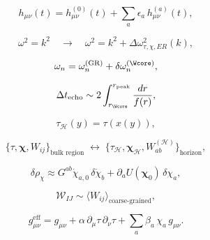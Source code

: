 \[
h_{\mu\nu}(t)
=
h^{(0)}_{\mu\nu}(t)
+
\sum_a \epsilon_a\, h^{(a)}_{\mu\nu}(t),
\]

\[
\omega^2 = k^2 \quad \longrightarrow \quad
\omega^2 = k^2 + \Delta\omega^2_{\tau,\chi,ER}(k),
\]

\[
\omega_n = \omega_n^{\mathrm{(GR)}} + \delta\omega_n^{(\Wcore)},
\]

\[
\Delta t_{\mathrm{echo}} \sim 2\int_{r_{\Wcore}}^{r_{\mathrm{peak}}} \frac{dr}{f(r)},
\]

\[
\tau_{\mathcal{H}}(y) = \tau(x(y)),
\]

\[
\{\tau,\bm{\chi},W_{ij}\}_{\text{bulk region}} \;\longleftrightarrow\;
  \{\tau_{\mathcal{H}},\bm{\chi}_{\mathcal{H}},W_{ab}^{(\mathcal{H})}\}_{\text{horizon}},
\]

\[
\delta \rho_\chi \approx G^{ab}\dot{\chi}_{a,0}\,\delta\dot{\chi}_b + \partial_a U(\bm{\chi}_0)\,\delta\chi_a,
\]

\[
\mathcal{W}_{IJ} \sim \langle W_{ij} \rangle_{\text{coarse-grained}},
\]

\[
g_{\mu\nu}^{\mathrm{eff}} = g_{\mu\nu} + \alpha\,\partial_\mu\tau\,\partial_\nu\tau 
+ \sum_a \beta_a\,\chi_a\,g_{\mu\nu}.
\]

